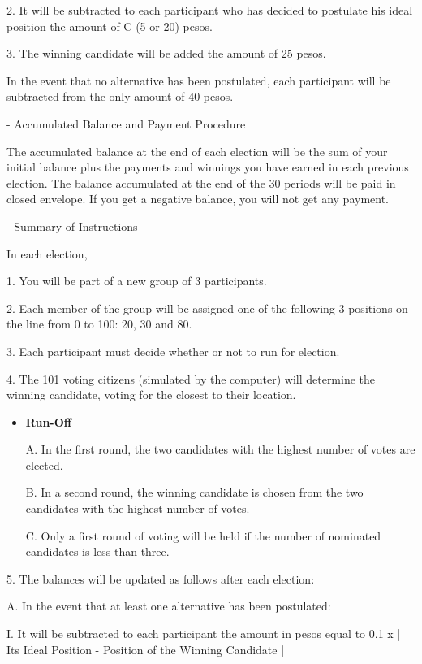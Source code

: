 2. It will be subtracted to each participant who has decided to postulate his ideal position the amount of C (5 or 20) pesos.

3. The winning candidate will be added the amount of 25 pesos.

In the event that no alternative has been postulated, each participant will be subtracted from the only amount of 40 pesos.

- Accumulated Balance and Payment Procedure

The accumulated balance at the end of each election will be the sum of your initial balance plus the payments and winnings you have earned in each previous election. The balance accumulated at the end of the 30 periods will be paid in closed envelope. If you get a negative balance, you will not get any payment.

- Summary of Instructions

In each election,

1. You will be part of a new group of 3 participants.

2. Each member of the group will be assigned one of the following 3 positions on the line from 0 to 100: 20, 30 and 80.

3. Each participant must decide whether or not to run for election.

4. The 101 voting citizens (simulated by the computer) will determine the winning candidate, voting for the closest to their location.

\begin{itemize}
	\item \textbf{Run-Off}

	A. In the first round, the two candidates with the highest number of votes are elected.
	
	B. In a second round, the winning candidate is chosen from the two candidates with the highest number of votes.
	
	C. Only a first round of voting will be held if the number of nominated candidates is less than three.
	
\end{itemize}

5. The balances will be updated as follows after each election:

A. In the event that at least one alternative has been postulated:

I. It will be subtracted to each participant the amount in pesos equal to 0.1 x | Its Ideal Position - Position of the Winning Candidate |

